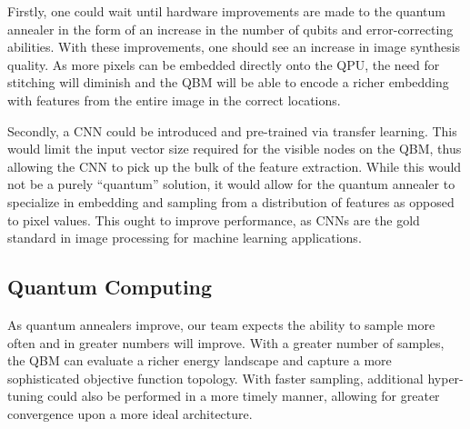 \documentclass[technologies,article,accept,pdftex,moreauthors]{Definitions/mdpi}
\begin{document}
Firstly, one could wait until hardware improvements are made to the quantum annealer in the form of an increase in the number of qubits and error-correcting abilities. With these improvements, one should see an increase in image synthesis quality. As more pixels can be embedded directly onto the QPU, the need for stitching will diminish and the QBM will be able to encode a richer embedding with features from the entire image in the correct locations.


Secondly, a CNN could be introduced and pre-trained via transfer learning. This would limit the input vector size required for the visible nodes on the QBM, thus allowing the CNN to pick up the bulk of the feature extraction. While this would not be a purely ``quantum'' solution, it would allow for the quantum annealer to specialize in embedding and sampling from a distribution of features as opposed to pixel values. This ought to improve performance, as CNNs are the gold standard in image processing for machine learning applications.

\subsection{Quantum Computing}
As quantum annealers improve, our team expects the ability to sample more often and in greater numbers will improve. With a greater number of samples, the QBM can evaluate a richer energy landscape and capture a more sophisticated objective function topology. With faster sampling, additional hyper-tuning could also be performed in a more timely manner, allowing for greater convergence upon a more ideal architecture.%

\vspace{6pt}


\authorcontributions{\hl{~~~}}%

\funding{\hl{~~~}}%
\end{document}
